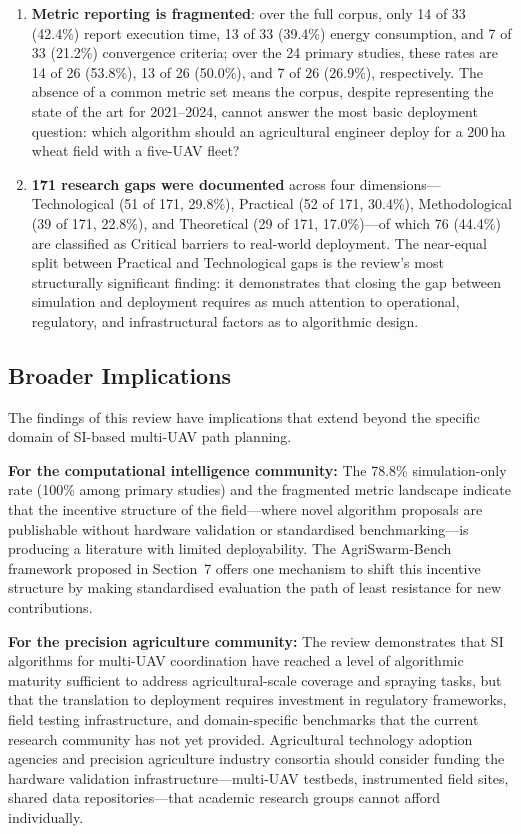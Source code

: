 \documentclass[review,3p,times]{elsarticle}
\begin{document}
\begin{itemize}
{\begin{enumerate}
  \item \textbf{Metric reporting is fragmented}: over the full corpus, only 14 of 33 (42.4\%) report execution time, 13 of 33 (39.4\%) energy consumption, and 7 of 33 (21.2\%) convergence criteria; over the 24 primary studies, these rates are 14 of 26 (53.8\%), 13 of 26 (50.0\%), and 7 of 26 (26.9\%), respectively. The absence of a common metric set means the corpus, despite representing the state of the art for 2021--2024, cannot answer the most basic deployment question: which algorithm should an agricultural engineer deploy for a 200\,ha wheat field with a five-UAV fleet?

  \item \textbf{171 research gaps were documented} across four dimensions---Technological (51 of 171, 29.8\%), Practical (52 of 171, 30.4\%), Methodological (39 of 171, 22.8\%), and Theoretical (29 of 171, 17.0\%)---of which 76 (44.4\%) are classified as Critical barriers to real-world deployment. The near-equal split between Practical and Technological gaps is the review's most structurally significant finding: it demonstrates that closing the gap between simulation and deployment requires as much attention to operational, regulatory, and infrastructural factors as to algorithmic design.
\end{enumerate}

\subsection{Broader Implications}

The findings of this review have implications that extend beyond the specific domain of SI-based multi-UAV path planning.

\textbf{For the computational intelligence community:} The 78.8\% simulation-only rate (100\% among primary studies) and the fragmented metric landscape indicate that the incentive structure of the field---where novel algorithm proposals are publishable without hardware validation or standardised benchmarking---is producing a literature with limited deployability. The AgriSwarm-Bench framework proposed in Section~7 offers one mechanism to shift this incentive structure by making standardised evaluation the path of least resistance for new contributions.

\textbf{For the precision agriculture community:} The review demonstrates that SI algorithms for multi-UAV coordination have reached a level of algorithmic maturity sufficient to address agricultural-scale coverage and spraying tasks, but that the translation to deployment requires investment in regulatory frameworks, field testing infrastructure, and domain-specific benchmarks that the current research community has not yet provided. Agricultural technology adoption agencies and precision agriculture industry consortia should consider funding the hardware validation infrastructure---multi-UAV testbeds, instrumented field sites, shared data repositories---that academic research groups cannot afford individually.

}
\end{itemize}
\end{document}
